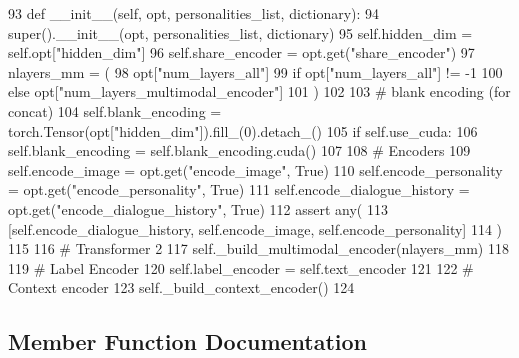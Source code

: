 \begin{DoxyCode}
93     \textcolor{keyword}{def }\_\_init\_\_(self, opt, personalities\_list, dictionary):
94         super().\_\_init\_\_(opt, personalities\_list, dictionary)
95         self.hidden\_dim = self.opt[\textcolor{stringliteral}{"hidden\_dim"}]
96         self.share\_encoder = opt.get(\textcolor{stringliteral}{"share\_encoder"})
97         nlayers\_mm = (
98             opt[\textcolor{stringliteral}{"num\_layers\_all"}]
99             \textcolor{keywordflow}{if} opt[\textcolor{stringliteral}{"num\_layers\_all"}] != -1
100             \textcolor{keywordflow}{else} opt[\textcolor{stringliteral}{"num\_layers\_multimodal\_encoder"}]
101         )
102 
103         \textcolor{comment}{# blank encoding (for concat)}
104         self.blank\_encoding = torch.Tensor(opt[\textcolor{stringliteral}{"hidden\_dim"}]).fill\_(0).detach\_()
105         \textcolor{keywordflow}{if} self.use\_cuda:
106             self.blank\_encoding = self.blank\_encoding.cuda()
107 
108         \textcolor{comment}{# Encoders}
109         self.encode\_image = opt.get(\textcolor{stringliteral}{"encode\_image"}, \textcolor{keyword}{True})
110         self.encode\_personality = opt.get(\textcolor{stringliteral}{"encode\_personality"}, \textcolor{keyword}{True})
111         self.encode\_dialogue\_history = opt.get(\textcolor{stringliteral}{"encode\_dialogue\_history"}, \textcolor{keyword}{True})
112         \textcolor{keyword}{assert} any(
113             [self.encode\_dialogue\_history, self.encode\_image, self.encode\_personality]
114         )
115 
116         \textcolor{comment}{# Transformer 2}
117         self.\_build\_multimodal\_encoder(nlayers\_mm)
118 
119         \textcolor{comment}{# Label Encoder}
120         self.label\_encoder = self.text\_encoder
121 
122         \textcolor{comment}{# Context encoder}
123         self.\_build\_context\_encoder()
124 
\end{DoxyCode}


\subsection{Member Function Documentation}
\mbox{\label{classprojects_1_1image__chat_1_1transresnet__multimodal_1_1modules_1_1TransresnetMultimodalModel_a562a24d9e23ea9fcd7e5975e1758e0a6}} 
